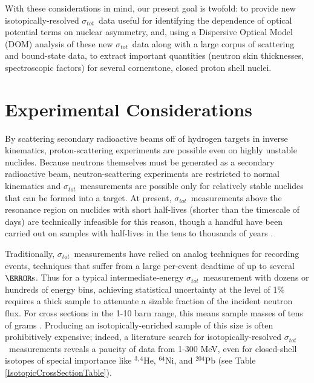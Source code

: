 \documentclass[twocolumn,secnumarabic,amssymb, nobibnotes, aps, prl,
superscriptaddress, nobalancelastpage]{revtex4}
\newcommand{\tot}{\ensuremath{\sigma_{tot}}}
\begin{document}
With these considerations in mind, our present goal is twofold: to
provide new isotopically-resolved \tot\ data useful for identifying the 
dependence of optical 
potential terms on nuclear asymmetry, and, using a Dispersive Optical Model
(DOM) analysis of these new \tot\ data along with a large corpus of scattering
and bound-state data, to extract important quantities (neutron skin
thicknesses, spectroscopic factors) for several cornerstone,
closed proton shell nuclei.


\section{Experimental Considerations}
By scattering secondary radioactive beams off of hydrogen targets in inverse
kinematics, proton-scattering experiments are possible even on highly unstable
nuclides. Because neutrons themselves must be generated as a
secondary radioactive beam, neutron-scattering experiments are restricted to
normal kinematics and \tot\ measurements are possible only for relatively stable
nuclides that can be formed into a target. At present, \tot\ measurements above
the resonance region on nuclides with short half-lives (shorter than the timescale of
days) are technically infeasible for this reason, though a handful have been carried out on
samples with half-lives in the tens to thousands of years \cite{Poenitz1983,
Phillips1980, Foster1971}.

Traditionally, \tot\ measurements have relied on analog techniques for recording
events, techniques that suffer from a large per-event deadtime of
up to several $\micro\second$. Thus for a typical intermediate-energy \tot\ measurement
with dozens or hundreds of energy bins, achieving statistical uncertainty at the
level of 1\% requires a thick sample to attenuate a sizable fraction of the
incident neutron flux. For cross sections in the 1-10 barn range, this means
sample masses of tens of grams \cite{Finlay1993, Abfalterer2001}.
Producing an isotopically-enriched sample of this size is often
prohibitively expensive; indeed, a literature search for isotopically-resolved
\tot\ measurements reveals a paucity of data from 1-300 MeV, even for
closed-shell isotopes of special importance like $^{3,4}$He, $^{64}$Ni, and
$^{204}$Pb (see Table \ref{IsotopicCrossSectionTable}).
\end{document}
